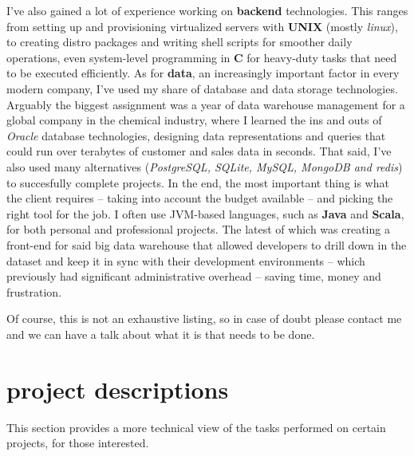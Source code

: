 \documentclass[]{friggeri-cv}
\begin{document}
I've also gained a lot of experience working on \textbf{backend} technologies. This ranges from setting up and provisioning virtualized servers with \textbf{UNIX} (mostly \emph{linux}), to creating distro packages and writing shell scripts for smoother daily operations, even system-level programming in \textbf{C} for heavy-duty tasks that need to be executed efficiently. As for \textbf{data}, an increasingly important factor in every modern company, I've used my share of database and data storage technologies. Arguably the biggest assignment was a year of data warehouse management for a global company in the chemical industry, where I learned the ins and outs of \emph{Oracle} database technologies, designing data representations and queries that could run over terabytes of customer and sales data in seconds. That said, I've also used many alternatives (\emph{PostgreSQL, SQLite, MySQL, MongoDB and redis}) to succesfully complete projects. In the end, the most important thing is what the client requires -- taking into account the budget available -- and picking the right tool for the job. I often use JVM-based languages, such as \textbf{Java} and \textbf{Scala}, for both personal and professional projects. The latest of which was creating a front-end for said big data warehouse that allowed developers to drill down in the dataset and keep it in sync with their development environments -- which previously had significant administrative overhead -- saving time, money and frustration.

Of course, this is not an exhaustive listing, so in case of doubt please contact me and we can have a talk about what it is that needs to be done.

\section{project descriptions}

This section provides a more technical view of the tasks performed on certain projects, for those interested.
\end{document}
